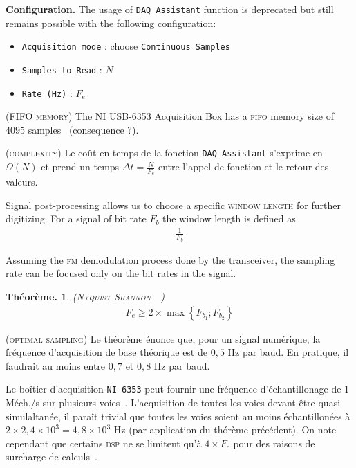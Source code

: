 \documentclass[twocolumn,pre,floats,aps,amsmath,amssymb]{revtex4}
\newtheorem{theorem}{Th\'eor\`eme.}[section]
\newenvironment{remark}[1][Remarque.]{\begin{trivlist}
\item[\hskip \labelsep {\bfseries #1}]}{\end{trivlist}}
\begin{document}
\noindent
\textbf{Configuration.} The usage of \texttt{DAQ Assistant} function is deprecated but still remains possible with the following configuration:
\begin{itemize}
  \item{\texttt{Acquisition mode} : choose \texttt{Continuous Samples}}~\cite{NI_continuous_samp}
  \item{\texttt{Samples to Read} : $N$}
  \item{\texttt{Rate (Hz)} : $F_e$}
\end{itemize}

\begin{remark}
  (\textsc{FIFO memory})
  The NI USB-6353 Acquisition Box has a \textsc{fifo} memory size of $4095$ samples~\cite{NI_6353_datasheet} (consequence ?).
\end{remark}

\begin{remark}
  \textsc{(complexity)}
  Le co\^ut en temps de la fonction \texttt{DAQ Assistant} s'exprime en $\Omega(N)$\cite{omega} et prend un temps $\Delta t = \frac{N}{F_e}$ entre l'appel de fonction et le retour des valeurs.
\end{remark}

Signal post-processing allows us to choose a specific \textsc{window length} for further digitizing. For a signal of bit rate $F_b$ the window length is defined as
\begin{eqnarray*}
  \frac{1}{F_b}
\end{eqnarray*}

Assuming the \textsc{fm} demodulation process done by the transceiver, the sampling rate can be focused only on the bit rates in the signal.
\begin{theorem} (\textsc{Nyquist-Shannon}~\cite{Nyquist}~\cite{Shannon})
  \begin{eqnarray}
    F_e \geq 2 \times \operatorname{max} \left \{ F_{b_1} ; F_{b_2} \right \}
  \end{eqnarray}
\end{theorem}

\begin{remark}
  \textsc{(optimal sampling)}
  Le th\'eor\`eme \'enonce que, pour un signal num\'erique, la fr\'equence d'acquisition de base th\'eorique est de $0,5$ Hz par baud. En pratique, il faudrait au moins entre $0,7$ et $0,8$ Hz par baud\cite{FV}.
\end{remark}

Le bo\^itier d'acquisition \texttt{NI-6353} peut fournir une fr\'equence d'\'echantillonage de $1$ M\'ech./s sur plusieurs voies~\cite{NI_6353_datasheet}. L'acquisition de toutes les voies devant \^etre quasi-simulaltan\'ee, il para\^it trivial que toutes les voies soient au moins \'echantillon\'ees \`a $2 \times 2,4 \times 10^3 = 4,8 \times 10^3$ Hz (par application du th\'or\`eme pr\'ec\'edent). On note cependant que certains \textsc{dsp} ne se limitent qu'\`a $4 \times F_c$ pour des raisons de surcharge de calculs~\cite{TI_MSP430}.
\end{document}
